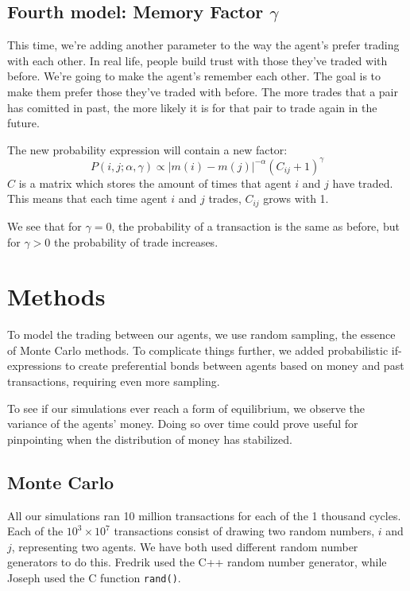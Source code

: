 \documentclass[12pt,a4paper]{article}
\begin{document}
\subsection{Fourth model: Memory Factor $\gamma$} \label{sec:model4}
This time, we're adding another parameter to the way the agent's prefer trading with each other.
In real life, people build trust with those they've traded with before. We're going to make the agent's remember each other. The goal is to make them prefer those they've traded with before.
The more trades that a pair has comitted in past, the more likely it is for that pair to trade again in the future.

The new probability expression will contain a new factor:
\begin{equation}
 P(i,j;\alpha,\gamma) \propto \left|m(i)-m(j) \right|^{-\alpha}(C_{ij} + 1)^{\gamma}
\end{equation}
$C$ is a matrix which stores the amount of times that agent $i$ and $j$ have traded.
This means that each time agent $i$ and $j$ trades, $C_{ij}$ grows with 1.

We see that for $\gamma = 0$, the probability of a transaction is the same as before, but for
$\gamma > 0$ the probability of trade increases.

\clearpage

\section{Methods}

To model the trading between our agents, we use random sampling, the essence of Monte Carlo methods.
To complicate things further, we added probabilistic if-expressions to create preferential bonds between agents based on money and past transactions, requiring even more sampling.

To see if our simulations ever reach a form of equilibrium, we observe the variance of the agents' money. Doing so over time could prove useful for pinpointing when the distribution of money has stabilized.
\subsection{Monte Carlo}
All our simulations ran 10 million transactions for each of  the 1 thousand cycles. Each of the $10^3 \times 10^7$ transactions consist of drawing two random numbers, $i$ and $j$, representing two agents.
We have both used different random number generators to do this. Fredrik used the C++ random number generator, while Joseph used the C function \verb|rand()|.
\end{document}
